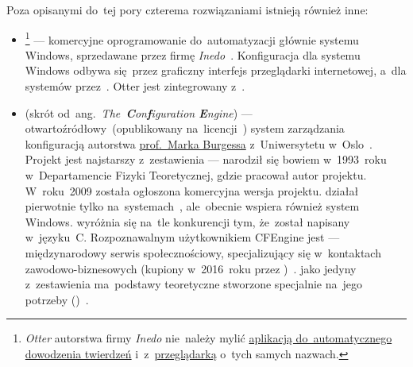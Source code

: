 \documentclass[thesis]{subfiles}
\begin{document}
Poza opisanymi do~tej pory czterema rozwiązaniami istnieją również inne:\mynobreakpar
\begin{itemize}
	\item {}\footnote{\emph{Otter} autorstwa firmy \emph{Inedo} nie~należy mylić \href{https://en.wikipedia.org/wiki/Prover9\#Predecessor}{aplikacją do~automatycznego dowodzenia twierdzeń} i~z~\href{https://pl.wikipedia.org/wiki/Otter\_Browser}{przeglądarką} o~tych samych nazwach.} --- komercyjne oprogramowanie do~automatyzacji głównie systemu Windows, sprzedawane przez firmę \emph{Inedo}~\cite{otter}. Konfiguracja dla systemu Windows odbywa się~przez graficzny interfejs przeglądarki internetowej, a~dla systemów  przez~\ssh{}. Otter jest zintegrowany z~.
	\item\label{itm:cfengine} \emph{\cfengine{}} (skrót od~ang.~\emph{The~\textbf{C}on\textbf{f}iguration \textbf{E}ngine}) --- otwartoźródłowy~(opublikowany na~licencji~) system zarządzania konfiguracją autorstwa \href{https://en.wikipedia.org/wiki/Mark_Burgess_(computer_scientist)}{prof.~Marka Burgessa} z~Uniwersytetu w~Oslo~\cite{cfengine}. Projekt jest najstarszy z~zestawienia --- narodził się bowiem w~1993~roku w~Departamencie Fizyki Teoretycznej, gdzie pracował autor projektu. W~roku~2009 została ogłoszona komercyjna wersja projektu. \cfengine{} działał pierwotnie tylko na~systemach~, ale~obecnie wspiera również system Windows. \cfengine{} wyróżnia się na~tle konkurencji tym, że~został napisany w~języku~C. Rozpoznawalnym użytkownikiem CFEngine jest  --- międzynarodowy serwis społecznościowy, specjalizujący się w~kontaktach zawodowo-biznesowych (kupiony w~2016~roku przez )~\cite{cfengine-linkedin}. \cfengine{} jako jedyny z~zestawienia ma~podstawy teoretyczne stworzone specjalnie na~jego potrzeby ()~\cite{cfengine-whitepaper,mark-burgess-webpage}.

\end{itemize}
\end{document}
